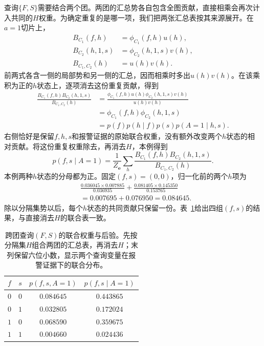 查询$\{F,S\}$需要结合两个团。两团的汇总势各自包含全图贡献，直接相乘会再次计入共同的$H$权重。为确定重复的是哪一项，我们把两张汇总表按其来源展开。在$a=1$切片上，
\[
  \begin{aligned}
    B_{C_1}(f,h)&=\phi_{C_1}(f,h)u(h),\\
    B_{C_2}(h,1,s)&=\phi_{C_2}(h,1,s)v(h),\\
    B_{C_1,C_2}(h)&=u(h)v(h).
  \end{aligned}
\]
前两式各含一侧的局部势和另一侧的汇总，因而相乘时多出$u(h)v(h)$。在该乘积为正的$h$状态上，逐项消去这份重复贡献，得到
\[
  \begin{aligned}
    \frac{B_{C_1}(f,h)B_{C_2}(h,1,s)}{B_{C_1,C_2}(h)}
      &=\frac{\phi_{C_1}(f,h)u(h)\phi_{C_2}(h,1,s)v(h)}{u(h)v(h)}\\
      &=\phi_{C_1}(f,h)\phi_{C_2}(h,1,s)\\
      &=p(f)p(h\mid f)p(s)p(A=1\mid h,s).
  \end{aligned}
\]
右侧恰好是保留$f,h,s$和报警证据的原始联合权重，没有额外改变两个$h$状态的相对贡献。将这份重复权重除去，再消去$H$，本例得到
\begin{equation}
  p(f,s\mid A=1)
    =\frac{1}{Z_{\bm{e}}}
      \sum_h
       \frac{B_{C_1}(f,h)B_{C_2}(h,1,s)}
            {B_{C_1,C_2}(h)}.
  \label{eq:pgm-junction-tree-cross-clique-device}
\end{equation}
本例两种$h$状态的分母都为正。固定$(f,s)=(0,0)$，归一化前的两个$h$项为
\[
  \begin{aligned}
    &\frac{0.036045\times0.007885}{0.036935}
     +\frac{0.081405\times0.145350}{0.153765}\\
    &=0.007695+0.076950=0.084645.
  \end{aligned}
\]
除以分隔集势以后，每个$h$状态的共同贡献只保留一份。表~\ref{tab:pgm-junction-tree-cross-query}给出四组$(f,s)$的结果，与直接消去$H$的联合表一致。

\begin{table}[htbp]
  \centering
  \begin{tabular}{cccc}
    \toprule
    $f$ & $s$ & $p(f,s,A=1)$ & $p(f,s\mid A=1)$\\
    \midrule
    $0$ & $0$ & $0.084645$ & $0.443865$\\
    $0$ & $1$ & $0.032805$ & $0.172024$\\
    $1$ & $0$ & $0.068590$ & $0.359675$\\
    $1$ & $1$ & $0.004660$ & $0.024436$\\
    \bottomrule
  \end{tabular}
  \caption{跨团查询$(F,S)$的联合权重与后验。先按分隔集$H$组合两团的汇总表，再消去$H$；末列保留六位小数，显示两个查询变量在报警证据下的联合分布。}
  \label{tab:pgm-junction-tree-cross-query}
\end{table}

